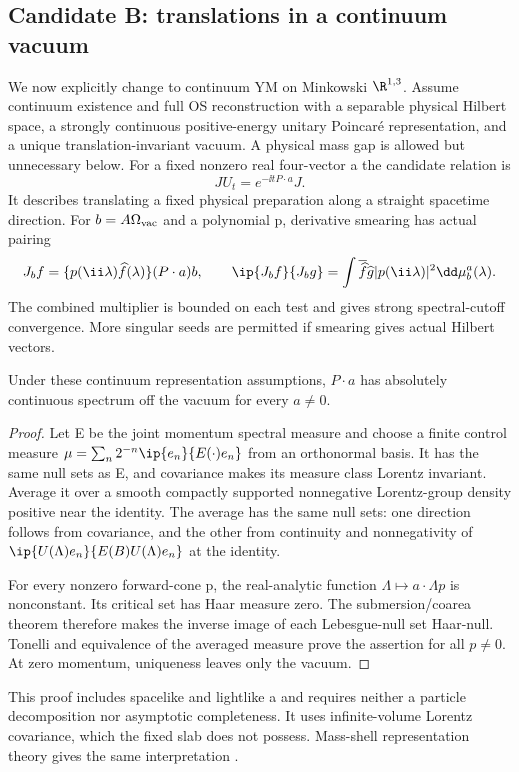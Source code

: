 \subsection{Candidate B: translations in a continuum vacuum}
We now explicitly change to continuum YM on Minkowski
$\R^{1,3}$. Assume continuum existence and full OS
reconstruction with a separable physical Hilbert space,
a strongly continuous positive-energy unitary Poincar\'e
representation, and a unique translation-invariant vacuum.
A physical mass gap is allowed but unnecessary below.
For a fixed nonzero real four-vector a the candidate relation is
\begin{equation}\label{eq:spacetime-source}
JU_t=e^{-\ii tP\cdot a}J.
\end{equation}
It describes translating a fixed physical preparation along a
straight spacetime direction. For $b=A\Omega_{\rm vac}$ and
a polynomial p, derivative smearing has actual pairing
\begin{equation}
J_bf=\{p(\ii\lambda)\widehat f(\lambda)\}(P\cdot a)b,
\qquad
\ip{J_bf}{J_bg}=\int\overline{\widehat f}\widehat g
                         |p(\ii\lambda)|^2\dd\mu_b^a(\lambda).
\end{equation}
The combined multiplier is bounded on each test and gives
strong spectral-cutoff convergence. More singular seeds
are permitted if smearing gives actual Hilbert vectors.

\begin{lemma}\label{lem:spacetime-ac}
Under these continuum representation assumptions,
$P\cdot a$ has absolutely continuous spectrum off the
vacuum for every $a\ne0$.
\end{lemma}
\begin{proof}
Let E be the joint momentum spectral measure and choose a
finite control measure
$\mu=\sum_n2^{-n}\ip{e_n}{E(\cdot)e_n}$ from an orthonormal
basis. It has the same null sets as E, and covariance makes
its measure class Lorentz invariant. Average it over a smooth
compactly supported nonnegative Lorentz-group density positive
near the identity. The average has the same null sets:
one direction follows from covariance, and the other from
continuity and nonnegativity of
$\ip{U(\Lambda)e_n}{E(B)U(\Lambda)e_n}$ at the identity.

For every nonzero forward-cone p, the real-analytic function
$\Lambda\mapsto a\cdot\Lambda p$ is nonconstant. Its critical
set has Haar measure zero. The submersion/coarea theorem
therefore makes the inverse image of each Lebesgue-null set
Haar-null. Tonelli and equivalence of the averaged measure
prove the assertion for all $p\ne0$. At zero momentum,
uniqueness leaves only the vacuum.
\end{proof}
This proof includes spacelike and lightlike a and requires
neither a particle decomposition nor asymptotic completeness.
It uses infinite-volume Lorentz covariance, which the fixed
slab does not possess. Mass-shell representation theory gives
the same interpretation \cite{bekaert-boulanger}.

